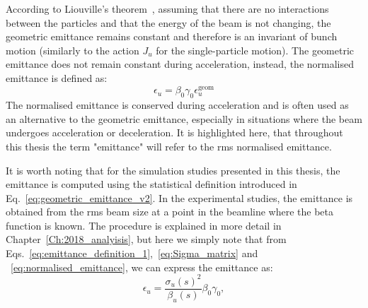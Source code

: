  
 
 According to Liouville’s theorem~\cite{wolski2014}, assuming that there are no interactions between the particles and that the energy of the beam is not changing, the geometric emittance remains constant and therefore is an invariant of bunch motion (similarly to the action $J_u$ for the single-particle motion). The geometric emittance does not remain constant during acceleration, instead, the normalised emittance is defined as:
 \begin{equation}\label{eq:normalised_emittance}
     \epsilon_u = \beta_0 \gamma_0 \epsilon^{\mathrm{geom}}_u
 \end{equation}
 The normalised emittance is conserved during acceleration and is often used as an alternative to the geometric emittance, especially in situations where the beam undergoes acceleration or deceleration. It is highlighted here, that throughout this thesis the term "emittance" will refer to the rms normalised emittance.
 
 It is worth noting that for the simulation studies presented in this thesis, the emittance is computed using the statistical definition introduced in Eq.~\eqref{eq:geometric_emittance_v2}. In the experimental studies, the emittance is obtained from the rms beam size at a point in the beamline where the beta function is known. The procedure is explained in more detail in Chapter~\ref{Ch:2018_analyisis}, but here we simply note that from Eqs.~\eqref{eq:emittance_definition_1},~\eqref{eq:Sigma_matrix} and ~\eqref{eq:normalised_emittance}, we can express the emittance as:
 \begin{equation}\label{eq:emit_from_beam_size}
     \epsilon_{u} = \frac{\sigma_u(s)^2}{\beta_u(s)} \beta_0 \gamma_0,
 \end{equation}
 
